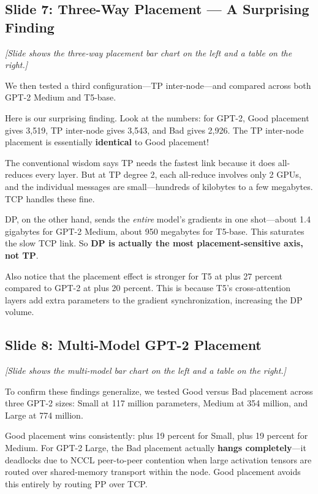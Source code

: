 \documentclass[11pt, a4paper]{article}
\begin{document}
\subsection{Slide 7: Three-Way Placement --- A Surprising Finding}
\textit{[Slide shows the three-way placement bar chart on the left and a table on the right.]}

We then tested a third configuration---TP inter-node---and compared across both GPT-2 Medium and T5-base.

Here is our surprising finding. Look at the numbers: for GPT-2, Good placement gives 3,519, TP inter-node gives 3,543, and Bad gives 2,926. The TP inter-node placement is essentially \textbf{identical} to Good placement!

The conventional wisdom says TP needs the fastest link because it does all-reduces every layer. But at TP degree 2, each all-reduce involves only 2 GPUs, and the individual messages are small---hundreds of kilobytes to a few megabytes. TCP handles these fine.

DP, on the other hand, sends the \textit{entire} model's gradients in one shot---about 1.4 gigabytes for GPT-2 Medium, about 950 megabytes for T5-base. This saturates the slow TCP link. So \textbf{DP is actually the most placement-sensitive axis, not TP}.

Also notice that the placement effect is stronger for T5 at plus 27 percent compared to GPT-2 at plus 20 percent. This is because T5's cross-attention layers add extra parameters to the gradient synchronization, increasing the DP volume.

\subsection{Slide 8: Multi-Model GPT-2 Placement}
\textit{[Slide shows the multi-model bar chart on the left and a table on the right.]}

To confirm these findings generalize, we tested Good versus Bad placement across three GPT-2 sizes: Small at 117 million parameters, Medium at 354 million, and Large at 774 million.

Good placement wins consistently: plus 19 percent for Small, plus 19 percent for Medium. For GPT-2 Large, the Bad placement actually \textbf{hangs completely}---it deadlocks due to NCCL peer-to-peer contention when large activation tensors are routed over shared-memory transport within the node. Good placement avoids this entirely by routing PP over TCP.
\end{document}
